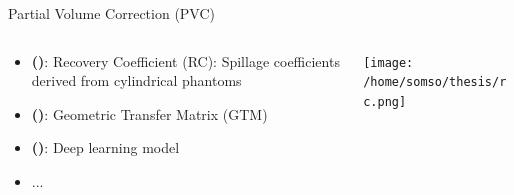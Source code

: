 \documentclass[aspectratio=169]{beamer}
\newcommand{\citeauthoryear}[1]{\citeauthor{#1} (\citeyear{#1})}
\begin{document}
\begin{frame}[t]{Partial Volume Correction (PVC)}
	\begin{columns}
		\begin{column}{0.65\textwidth}
			\small
			\begin{itemize}
				\setlength\itemsep{2em}
				\item \textbf{\citeauthoryear{feng2015image}}: Recovery Coefficient (RC): Spillage coefficients derived from cylindrical phantoms
				\item \textbf{\citeauthoryear{rousset1998correction}}: Geometric Transfer Matrix (GTM)
				\item \textbf{\citeauthoryear{ferrante2024physically}}: Deep learning model
				\item ...
			\end{itemize}
			\vspace{7em}
		\end{column}

		\begin{column}{0.35\textwidth}
			\texttt{[image: /home/somso/thesis/rc.png]}\par\vspace{1ex}


		\end{column}

	\end{columns}
\end{frame}
\end{document}
